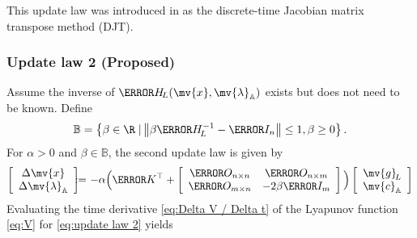 \documentclass[journal]{IEEEtranTIE}
\newcommand{\KYCH}[1]{{\color{blue} [KC: #1]}} %
\begin{document}
This update law was introduced in \cite{bhaya2006control} as the discrete-time Jacobian matrix transpose method (DJT). 

\subsubsection{Update law 2 (Proposed)}
Assume the inverse of $\mm{H}_{\! L}(\mv{x},\mv{\lambda}_{\mathbb{A}})$ exists but does not need to be known. Define 
%
\begin{align}\label{eq:beta set}
\mathbb{B} = \left\{\beta \in \R \; | \left \| \beta \mm{H}_{\! L}^{-1} - \mm{I}_n \right\| \le 1, \beta \ge 0 \right\}.
\end{align}
For $\alpha > 0$ and $\beta \in \mathbb{B}$, the second update law is given by 
%
\begin{eqnarray}\label{eq:update law 2}
\left[ {\begin{array}{*{20}{c}}
{\Delta \mv{x}}\\
{\Delta \mv{\lambda}_{\mathbb{A}}}
\end{array}} \right] 
& \!\!\!\! := \!\!\!\! &  - \alpha \Big(\mm{K}^\top + \left[ {\begin{array}{*{20}{c}}
\mm{O}_{n \times n}&\mm{O}_{n \times m}\\
\mm{O}_{m \times n}&{ - 2\beta {\mm{I}_m}}
\end{array}} \right] \Big) \left[ {\begin{array}{*{20}{c}}
{\mv{g}_{\!L}}\\
{\mv{c}_{\mathbb{A}}}
\end{array}} \right]\notag \\
\end{eqnarray}
%
Evaluating the time derivative \eqref{eq:Delta V / Delta t} of the Lyapunov function \eqref{eq:V} %
for \eqref{eq:update law 2} yields
%
\end{document}
